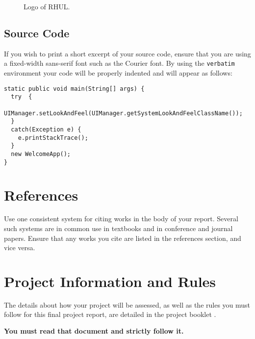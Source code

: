 \documentclass[]{final_report}
\theoremstyle{definition}
\begin{document}
\begin{figure}[h]
\centering
\fboxsep 2mm
\caption{\label{fig:logo} Logo of RHUL.}
\end{figure} 

\section{Source Code}

If you wish to print a short excerpt of your source code,  ensure that you are using a fixed-width sans-serif font such as the Courier font. By using the \verb|verbatim| environment your code will be properly indented and will appear as follows:

\begin{verbatim}
static public void main(String[] args) {
  try  {
    UIManager.setLookAndFeel(UIManager.getSystemLookAndFeelClassName());
  }
  catch(Exception e) {
    e.printStackTrace();
  }
  new WelcomeApp();
} 
\end{verbatim}

\chapter{References}

Use one consistent system for citing works in the body of your report. Several such systems are in common use in textbooks and in conference and journal papers. Ensure that any works you cite are listed in the references section, and vice versa. 

\chapter{Project Information and Rules}

The details about how your project will be assessed, as well as the rules you must follow for this final project report, are detailed in the project booklet
.

\textbf{You must read that document and strictly follow it.}


\newpage

\printbibliography
\label{endpage}
\end{document}
